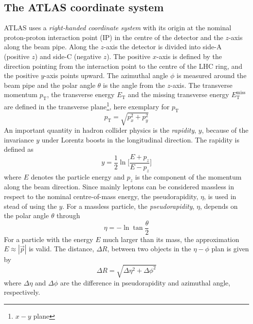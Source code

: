 \subsection{The ATLAS coordinate system}
\label{subsec:ae_atlas_coordinate}
ATLAS uses a \textit{right-handed coordinate system} with its origin at the nominal proton-proton interaction point (IP) in the centre of the detector and the $z$-axis along the beam pipe.
Along the $z$-axis the detector is divided into side-A (positive $z$) and side-C (negative $z$).
The positive $x$-axis is defined by the direction pointing from the interaction point to the centre of the LHC ring, and the positive $y$-axis points upward.%
The azimuthal angle $\phi$ is measured around the beam pipe  and the polar angle $\theta$ is the angle from the $z$-axis.
The transverse momentum $p_{\mathrm{T}}$, the transverse energy $E_{\mathrm{T}}$ and the missing transverse
energy $E_{\mathrm{T}}^{\mathrm{miss}}$ are defined in the transverse plane\footnote{$x-y$ plane}, here exemplary for $p_{\mathrm{T}}$
%
\begin{equation}
    p_{\mathrm{T}}= \sqrt{p_{x}^{2} + p_{y}^{2}}
\end{equation}
%
An important quantity in hadron collider physics is the \textit{rapidity}, $y$, because of the invariance $y$ under Lorentz boosts in the longitudinal direction.
The rapidity is defined as
%
\begin{equation}
    y = \frac{1}{2} \ln\Big[\frac{E + p_{z}}{E - p_{z}}\Big]
\end{equation}
%
where $E$ denotes the particle energy and $p_{z}$  is the component of the momentum along the beam direction.
Since mainly leptons can be considered massless in respect to the nominal centre-of-mass energy, the pseudorapidity, $\eta$, is used in stead of using the $y$.
For a massless particle, the \textit{pseudorapidity}, $\eta$, depends on the polar angle $\theta$ through
%
\begin{equation}
    \eta = - \ln \tan \frac{\theta}{2}
\end{equation}
%
For a particle with the energy $E$ much larger than its mass, the approximation $E \approx |\vec{p}|$ is valid.
The distance, $\Delta R$, between two objects in the $\eta-\phi$ plan is given by
%
\begin{equation}
    \Delta R = \sqrt{\Delta \eta^{2} + \Delta \phi^{2}}
\end{equation}
%
where $\Delta \eta$ and $\Delta \phi$ are the difference in pseudorapidity and azimuthal angle, respectively.

